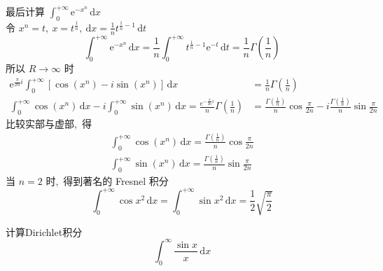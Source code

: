 \begin{solution}
		最后计算 $\int_{0}^{+\infty} \mathrm{e}^{-x^{n}}\,\mathrm{d} x $\\
		令 $ x^{n}=t,\  x=t^{\frac{1}{n}},\ \mathrm{d} x=\frac{1}{n} t^{\frac{1}{n}-1}\,\mathrm{d} t$ 
		$$\int_{0}^{+\infty} \mathrm{e}^{-x^{n}}\, \mathrm{d} x=\frac{1}{n} \int_{0}^{+\infty} t^{\frac{1}{n}-1} \mathrm{e}^{-t}\,\mathrm{d} t=\frac{1}{n} \Gamma\left(\frac{1}{n}\right)$$
		所以  $R \rightarrow \infty$  时
		$$\begin{aligned}
			\mathrm{e}^{\frac{\pi}{2 n} i} \int_{0}^{+\infty}\left[\cos \left(x^{n}\right)-i \sin \left(x^{n}\right)\right]\,\mathrm{d} x & =\frac{1}{n} \Gamma\left(\frac{1}{n}\right) \\
			\int_{0}^{+\infty} \cos \left(x^{n}\right)\,\mathrm{d} x-i \int_{0}^{+\infty} \sin \left(x^{n}\right)\,\mathrm{d} x=\frac{e^{-\frac{\pi}{2 n} i}}{n} \Gamma\left(\frac{1}{n}\right) & =\frac{\Gamma\left(\frac{1}{n}\right)}{n} \cos \frac{\pi}{2 n}-i \frac{\Gamma\left(\frac{1}{n}\right)}{n} \sin \frac{\pi}{2 n}
		\end{aligned}$$	
		比较实部与虚部,\  得
		$$\begin{array}{l}
			\int_{0}^{+\infty} \cos \left(x^{n}\right)\,\mathrm{d} x=\frac{\Gamma\left(\frac{1}{n}\right)}{n} \cos \frac{\pi}{2 n} \\
			\int_{0}^{+\infty} \sin \left(x^{n}\right)\,\mathrm{d} x=\frac{\Gamma\left(\frac{1}{n}\right)}{n} \sin \frac{\pi}{2 n}
		\end{array}$$
		当  $n=2$  时,\  得到著名的 Fresnel 积分
		$$\int_{0}^{+\infty}\cos x^{2}\,\mathrm{d} x=\int_{0}^{+\infty} \sin x^{2}\,\mathrm{d} x=\frac{1}{2} \sqrt{\frac{\pi}{2}}$$
	\end{solution}
	\newpage
	\begin{problem}
		计算Dirichlet积分
		$$\int_{0}^{\infty}\frac{\sin x}{x}\,\mathrm{d}x$$
	\end{problem}
